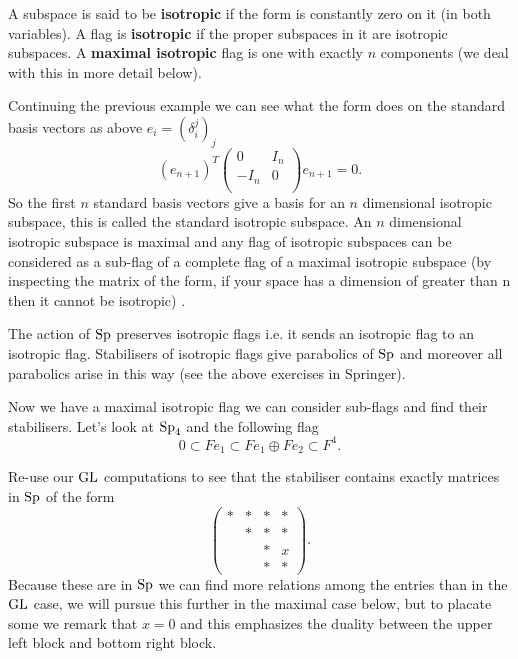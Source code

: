 A subspace is said to be \textbf{isotropic} if the form is constantly zero on it (in both variables). A flag is \textbf{isotropic} if the proper subspaces in it are isotropic subspaces. A \textbf{maximal isotropic} flag is one with exactly \(n\) components (we deal with this in more detail below).

\begin{example}
    Continuing the previous example we can see what the form does on the standard basis vectors as above \(e_i = (\delta_i^j)_{j}\)
        \[(e_{n+1})^T\begin{pmatrix}
            0 & I_n \\
            -I_n & 0\\
        \end{pmatrix}e_{n+1} = 0.\] 
        So the first \(n\) standard basis vectors give a basis for an \(n\) dimensional isotropic subspace, this is called the standard isotropic subspace. An \(n\) dimensional isotropic subspace is maximal and any flag of isotropic subspaces can be considered as a sub-flag of a complete flag of a maximal isotropic subspace (by inspecting the matrix of the form, if your space has a dimension of greater than n then it cannot be isotropic) \cite[\S 8]{BuildingsClassicalGroups}.
\end{example}

The action of \(\operatorname{Sp}\) preserves isotropic flags i.e. it sends an isotropic flag to an isotropic flag. Stabilisers of isotropic flags give parabolics of \(\operatorname{Sp}\) and moreover all parabolics arise in this way (see the above exercises in Springer).

\begin{example}
        Now we have a maximal isotropic flag we can consider sub-flags and find their stabilisers. Let's look at \(\operatorname{Sp}_4\) and the following flag
        \[0 \subset Fe_1 \subset Fe_1 \oplus Fe_2 \subset F^4.\]

        Re-use our \(\operatorname{GL}\) computations to see that the stabiliser contains exactly matrices in \(\operatorname{Sp}\) of the form
        \[\begin{pmatrix}
            *&*&*&* \\
             &*&*&* \\
             && *&x \\
             && *& *
        \end{pmatrix}.\]
        Because these are in \(\operatorname{Sp}\) we can find more relations among the entries than in the \(\operatorname{GL}\) case, we will pursue this further in the maximal case below, but to placate some we remark that \(x = 0\) and this emphasizes the duality between the upper left block and bottom right block.
    \end{example}

